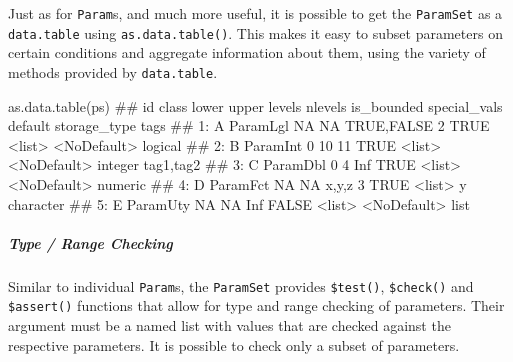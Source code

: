 \documentclass[]{article}
\newenvironment{Shaded}{}{}
\newcommand{\DataTypeTok}[1]{#1}
\newcommand{\DecValTok}[1]{#1}
\newcommand{\KeywordTok}[1]{\textcolor[rgb]{0.00,0.00,1.00}{#1}}
\newcommand{\NormalTok}[1]{#1}
\newcommand{\OperatorTok}[1]{#1}
\newcommand{\OtherTok}[1]{\textcolor[rgb]{1.00,0.25,0.00}{#1}}
\let\oldsubparagraph\subparagraph
\renewcommand{\subparagraph}[1]{\oldsubparagraph{#1}\mbox{}}
\renewenvironment{Shaded} {\begin{snugshade}\small} {\end{snugshade}}
\begin{document}
Just as for \texttt{Param}s, and much more useful, it is possible to get the \texttt{ParamSet} as a \texttt{data.table} using \texttt{as.data.table()}.
This makes it easy to subset parameters on certain conditions and aggregate information about them, using the variety of methods provided by \texttt{data.table}.

\begin{Shaded}
\begin{Highlighting}[]
\KeywordTok{as.data.table}\NormalTok{(ps)}
\NormalTok{##    id    class lower upper      levels nlevels is_bounded special_vals     default storage_type      tags}
\NormalTok{## 1:  A ParamLgl    NA    NA  TRUE,FALSE       2       TRUE       <list> <NoDefault>      logical          }
\NormalTok{## 2:  B ParamInt     0    10                  11       TRUE       <list> <NoDefault>      integer tag1,tag2}
\NormalTok{## 3:  C ParamDbl     0     4                 Inf       TRUE       <list> <NoDefault>      numeric          }
\NormalTok{## 4:  D ParamFct    NA    NA       x,y,z       3       TRUE       <list>           y    character          }
\NormalTok{## 5:  E ParamUty    NA    NA                 Inf      FALSE       <list> <NoDefault>         list}
\end{Highlighting}
\end{Shaded}

\hypertarget{type-range-checking-1}{%
\subparagraph{Type / Range Checking}\label{type-range-checking-1}}

Similar to individual \texttt{Param}s, the \texttt{ParamSet} provides \texttt{\$test()}, \texttt{\$check()} and \texttt{\$assert()} functions that allow for type and range checking of parameters.
Their argument must be a named list with values that are checked against the respective parameters.
It is possible to check only a subset of parameters.

\begin{Shaded}
\end{Shaded}
\end{document}
